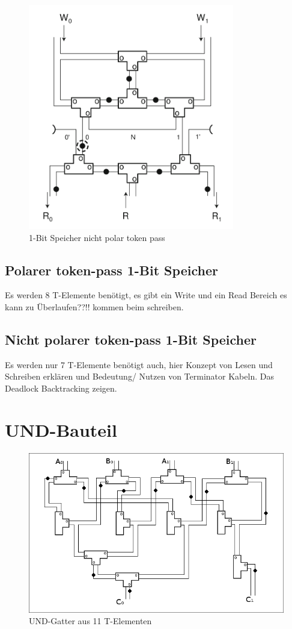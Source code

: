 \begin{figure}[h]
      \centering
      \includegraphics[width=9cm]{bilder/NonPolarMemory.png} 
      \caption{1-Bit Speicher nicht polar token pass}
\end{figure}

\subsection{Polarer token-pass 1-Bit Speicher}
Es werden 8 T-Elemente benötigt, es gibt ein Write und ein Read Bereich
es kann zu
Überlaufen??!!
kommen beim schreiben.  

\subsection{Nicht polarer token-pass 1-Bit Speicher}
Es werden nur 7 T-Elemente benötigt auch, hier Konzept von Lesen und Schreiben
erklären und Bedeutung/ Nutzen von Terminator Kabeln.
Das Deadlock Backtracking zeigen.

\section{UND-Bauteil}

\begin{figure}[h]
    \centering
    \includegraphics[width=12cm]{bilder/UndGatter.png}
    \caption{UND-Gatter aus 11 T-Elementen}
\end{figure}    


